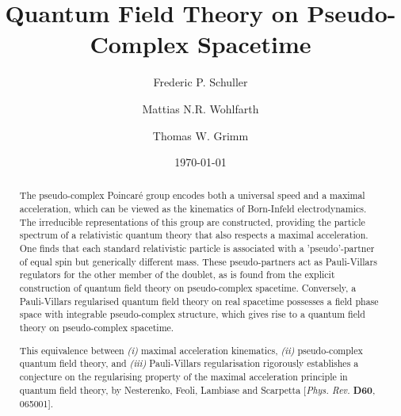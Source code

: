 \documentclass[a4paper,aps,prd,showkeys,showpacs,superscriptaddress,preprint]{revtex4}
\begin{document}
\title{Quantum Field Theory on Pseudo-Complex Spacetime}


\author{Frederic P. Schuller}
\author{Mattias N.R. Wohlfarth}
\author{Thomas W. Grimm}

\date{\today}

\begin{abstract}
  The pseudo-complex Poincar\'e group encodes both a universal
  speed and a maximal acceleration, which can be viewed as the
  kinematics of Born-Infeld electrodynamics. 
  The irreducible representations of this group are constructed,
  providing the particle spectrum of a relativistic quantum theory
  that also respects a maximal acceleration. One finds that each
  standard relativistic particle is associated with a
  'pseudo'-partner of equal spin but generically different mass.
  These pseudo-partners act as Pauli-Villars
  regulators for the other member of the doublet, as is found from the explicit
  construction of quantum field theory on pseudo-complex spacetime.
  Conversely, a Pauli-Villars regularised quantum field theory on real
  spacetime possesses a field phase space with integrable
  pseudo-complex structure, which gives rise to a quantum field theory
  on pseudo-complex spacetime.

  This equivalence between \textsl{(i)} maximal acceleration
  kinematics, \textsl{(ii)} pseudo-complex quantum field theory, and
  \textsl{(iii)} Pauli-Villars regularisation rigorously establishes a conjecture on the regularising
  property of the maximal acceleration principle in quantum field
  theory, by Nesterenko, Feoli, Lambiase and Scarpetta
  [\textsl{Phys. Rev.} \textbf{D60}, 065001].\\
\end{abstract}


\maketitle
\end{document}
